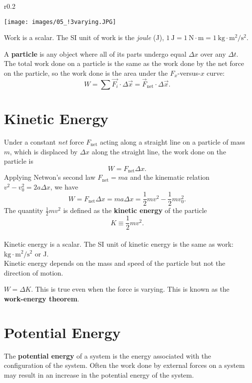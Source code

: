 \documentclass[11pt,a4paper]{report}
\begin{document}
\begin{wrapfigure}{r}{0.2\textwidth}
\vspace{-10pt}
\begin{center}
\texttt{[image: images/05\_!3varying.JPG]}
\end{center}
\end{wrapfigure}

\noindent
Work is a scalar. The SI unit of work is the \textit{joule} (J), $1 \mathrm{\ J} = 1 \mathrm{\ N} \cdot \mathrm{m} = 1 \mathrm{\ kg} \cdot \mathrm{m}^2 / \mathrm{s}^2$.

\smallskip

\noindent
A \textbf{particle} is any object where all of its parts undergo equal $\Delta{x}$ over any $\Delta{t}$.
\\The total work done on a particle is the same as the work done by the net force on the particle, so the work done is the area under the $F_x$-versus-$x$ curve: $$W = \sum{\vec{F_i}} \cdot \Delta{\vec{x}} = \vec{F}_\mathrm{net} \cdot \Delta{\vec{x}}.$$

\section{Kinetic Energy}
Under a constant \textit{net} force $F_\mathrm{net}$ acting along a straight line on a particle of mass $m$, which is displaced by $\Delta{x}$ along the straight line, the work done on the particle is $$W = F_\mathrm{net} \Delta{x}.$$
Applying Netwon's second law $F_\mathrm{net} = ma$ and the kinematic relation $v^2 - v_0^2 = 2a \Delta{x}$, we have $$W = F_\mathrm{net} \Delta{x} = ma \Delta{x} = \frac{1}{2} mv^2 - \frac{1}{2} mv_0^2.$$
The quantity $\frac{1}{2} mv^2$ is defined as the \textbf{kinetic energy} of the particle $$K \equiv \frac{1}{2} mv^2.$$
\\Kinetic energy is a scalar. The SI unit of kinetic energy is the same as work: $\mathrm{kg} \cdot \mathrm{m}^2 / \mathrm{s}^2$ or J.
\\Kinetic energy depends on the mass and speed of the particle but not the direction of motion.

\smallskip

\noindent
$W = \Delta{K}$. This is true even when the force is varying. This is known as the \textbf{work-energy theorem}.

\section{Potential Energy}
The \textbf{potential energy} of a system is the energy associated with the configuration of the system. Often the work done by external forces on a system may result in an increase in the potential energy of the system.
\end{document}
